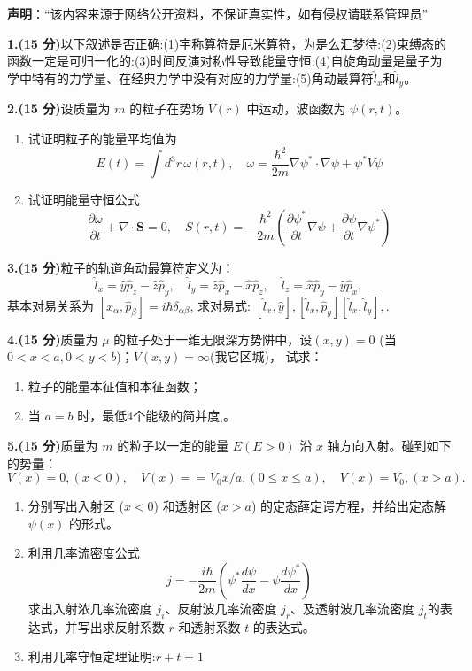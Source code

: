 
\textbf{声明}：“该内容来源于网络公开资料，不保证真实性，如有侵权请联系管理员”

\textbf{1.(15 分)}以下叙述是否正确:(1)宇称算符是厄米算符，为是么汇梦待:(2)束缚态的函数一定是可归一化的:(3)时间反演对称性导致能量守恒:(4)自旋角动量是量子为学中特有的力学量、在经典力学中没有对应的力学量:(5)角动最算符$\hat{l}_x$和$\hat{l}_y$。

\textbf{2.(15 分)}设质量为 $m$ 的粒子在势场 $V(r)$ 中运动，波函数为 $\psi(r,t)$。

\begin{enumerate}
    \item  试证明粒子的能量平均值为
    \[
    E(t) = \int d^3r \, \omega(r,t), \quad \omega = \frac{\hbar^2}{2m} \nabla \psi^* \cdot \nabla \psi + \psi^* V \psi~
    \]
    
    \item  试证明能量守恒公式
    \[
    \frac{\partial \omega}{\partial t} + \nabla \cdot \mathbf{S} = 0, \quad S(r,t) = -\frac{\hbar^2}{2m} \left(\frac{\partial \psi^*}{\partial t} \nabla \psi + \frac{\partial \psi}{\partial t} \nabla \psi^*\right)~
    \]
\end{enumerate}
\textbf{3.(15 分)}粒子的轨道角动最算符定义为：
\[
\hat{l}_x = \hat{y} \hat{p}_z - \hat{z} \hat{p}_y, \quad \hat{l}_y = \hat{z} \hat{p}_x - \hat{x} \hat{p}_z, \quad \hat{l}_z = \hat{x} \hat{p}_y - \hat{y} \hat{p}_x,~
\]
基本对易关系为
$[\hat{x}_\alpha, \hat{p}_\beta] = i\hbar \delta_{\alpha\beta}$, 求对易式: $[\hat{l}_x, \hat{y}] ,  [\hat{l}_x, \hat{p}_y] [\hat{l}_x, \hat{l}_y] , .$

\textbf{4.(15 分)}质量为 $\mu$ 的粒子处于一维无限深方势阱中，设$(x,y)=0$ (当 $0 < x < a, 0 < y < b$)；$V(x, y) =\infty$(我它区城)，
试求：
\begin{enumerate}
    \item  粒子的能量本征值和本征函数；
    \item  当 $a = b$ 时，最低4个能级的简并度,。
\end{enumerate}

\textbf{5.(15 分)}质量为 $m$ 的粒子以一定的能量 $E (E > 0)$ 沿 $x$ 轴方向入射。碰到如下的势量：
\[
V(x) = 0, (x < 0), \quad V(x) = =V_0 x/a, (0 \leq x \leq a), \quad V(x) = V_0, (x > a).~
\]

\begin{enumerate}
    \item  分别写出入射区 ($x < 0$) 和透射区 ($x > a$) 的定态薛定谔方程，并给出定态解 $\psi(x)$ 的形式。
    
    \item  利用几率流密度公式
    \[
    j = -\frac{i\hbar}{2m} \left(\psi^* \frac{d\psi}{dx} - \psi \frac{d\psi^*}{dx} \right)~
    \]
    求出入射浓几率流密度 $j_i$、反射波几率流密度 $j_r$、及透射波几率流密度 $j_t$的表达式，并写出求反射系数 $r$ 和透射系数 $t$ 的表达式。
    \item  利用几率守恒定理证明:$r+t=1$
\end{enumerate}


